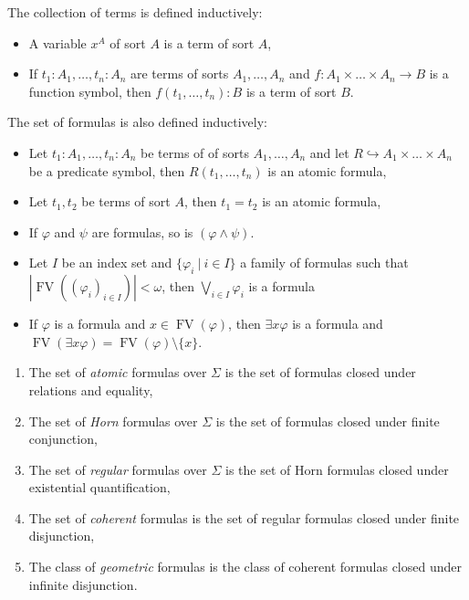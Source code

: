 \documentclass[a4paper]{article}
\theoremstyle{defin}
\theoremstyle{theorem}
\theoremstyle{claim}
\theoremstyle{prop}
\theoremstyle{lemma}
\theoremstyle{fact}
\theoremstyle{ex}
\theoremstyle{col}
\begin{document}
The collection of terms is defined inductively:
\begin{itemize}
\item A variable $x^A$ of sort $A$ is a term of sort $A$,
\item If $t_1 : A_1, \dots, t_n : A_n$ are terms of sorts $A_1, \dots, A_n$ and $f : A_1 \times \dots \times A_n \to B$ is a function symbol, then $f(t_1, \dots, t_n) : B$ is a term of sort $B$.
\end{itemize}

The set of formulas is also defined inductively:
\begin{itemize}
\item Let $t_1 : A_1, \dots, t_n : A_n$ be terms of of sorts $A_1, \dots, A_n$ and let $R \hookrightarrow A_1 \times \dots \times A_n$ be a predicate symbol, then $R(t_1, \dots, t_n)$ is an atomic formula,
\item Let $t_1, t_2$ be terms of sort $A$, then $t_1 = t_2$ is an atomic formula,
\item If $\varphi$ and $\psi$ are formulas, so is $(\varphi \wedge \psi)$.
\item Let $I$ be an index set and $\{ \varphi_i \: | \: i \in I \}$ a family of formulas such that $|\operatorname{FV}((\varphi_i)_{i \in I})| < \omega$, then $\bigvee \limits_{i \in I} \varphi_i$ is a formula
\item If $\varphi$ is a formula and $x \in \operatorname{FV}(\varphi)$, then $\exists x \varphi$ is a formula and $\operatorname{FV}(\exists x \varphi) = \operatorname{FV}(\varphi) \setminus \{ x \}$.
\end{itemize}

\begin{enumerate}
\item The set of \emph{atomic} formulas over $\Sigma$ is the set of formulas closed under relations and equality,
\item The set of \emph{Horn} formulas over $\Sigma$ is the set of formulas closed under finite conjunction,
\item The set of \emph{regular} formulas over $\Sigma$ is the set of Horn formulas closed under existential quantification,
\item The set of \emph{coherent} formulas is the set of regular formulas closed under finite disjunction,
\item The class of \emph{geometric} formulas is the class of coherent formulas closed under infinite disjunction.
\end{enumerate}
\end{document}

